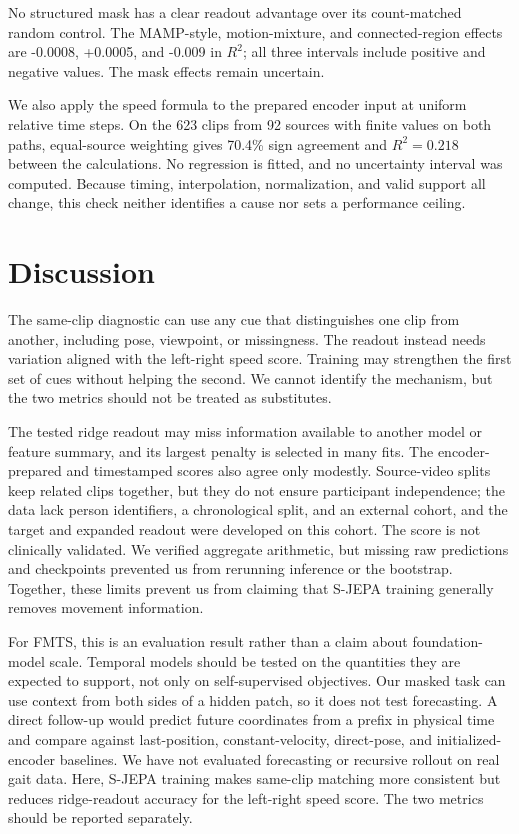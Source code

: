 \documentclass{article}
\begin{document}
No structured mask has a clear readout advantage over its count-matched
random control. The MAMP-style, motion-mixture, and connected-region
effects are -0.0008, +0.0005, and -0.009 in \(R^2\); all three intervals
include positive and negative values. The mask effects remain uncertain.

We also apply the speed formula to the prepared encoder input at uniform
relative time steps. On the 623 clips from 92 sources with finite values
on both paths, equal-source weighting gives 70.4\% sign agreement and
\(R^2=0.218\) between the calculations. No regression is fitted, and no
uncertainty interval was computed. Because timing, interpolation,
normalization, and valid support all change, this check neither
identifies a cause nor sets a performance ceiling.

\section{Discussion}\label{discussion}

The same-clip diagnostic can use any cue that distinguishes one clip
from another, including pose, viewpoint, or missingness. The readout
instead needs variation aligned with the left-right speed score.
Training may strengthen the first set of cues without helping the
second. We cannot identify the mechanism, but the two metrics should not
be treated as substitutes.

The tested ridge readout may miss information available to another model
or feature summary, and its largest penalty is selected in many fits.
The encoder-prepared and timestamped scores also agree only modestly.
Source-video splits keep related clips together, but they do not ensure
participant independence; the data lack person identifiers, a
chronological split, and an external cohort, and the target and expanded
readout were developed on this cohort. The score is not clinically
validated. We verified aggregate arithmetic, but missing raw predictions
and checkpoints prevented us from rerunning inference or the bootstrap.
Together, these limits prevent us from claiming that S-JEPA training
generally removes movement information.

For FMTS, this is an evaluation result rather than a claim about
foundation-model scale. Temporal models should be tested on the
quantities they are expected to support, not only on self-supervised
objectives. Our masked task can use context from both sides of a hidden
patch, so it does not test forecasting. A direct follow-up would predict
future coordinates from a prefix in physical time and compare against
last-position, constant-velocity, direct-pose, and initialized-encoder
baselines. We have not evaluated forecasting or recursive rollout on
real gait data. Here, S-JEPA training makes same-clip matching more
consistent but reduces ridge-readout accuracy for the left-right speed
score. The two metrics should be reported separately.
\end{document}
